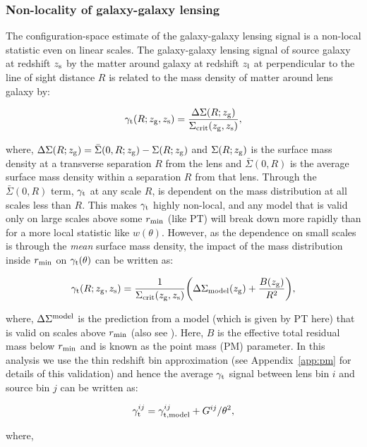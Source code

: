 \documentclass[aps, prd,twocolumn,superscriptaddress,nofootinbib,preprintnumbers]{revtex4-1}
\newcommand{\gammat}{\ensuremath{\gamma_{\rm t}(\theta)}}
\newcommand{\wtheta}{\ensuremath{w(\theta)}}
\begin{document}
\subsubsection{Non-locality of galaxy-galaxy lensing}  \label{sec:pm_theory}
The configuration-space estimate of the galaxy-galaxy lensing signal is a
non-local statistic even on linear scales. The galaxy-galaxy lensing
signal of source galaxy at redshift $z_{\rm s}$ by the matter around
galaxy at redshift $z_{\rm l}$ at perpendicular to the line of sight
distance $R$ is related to the mass density of matter around lens
galaxy by:
\begin{linenomath*}
\begin{equation}
    \gamma_{\rm t}(R;z_{\rm g},z_{\rm s}) = \frac{\Delta \Sigma (R;z_{\rm g})}{\Sigma_{\rm crit} (z_{\rm g},z_{\rm s})},
\end{equation}
\end{linenomath*}
where, $\Delta \Sigma(R;z_{\rm g}) = \bar{\Sigma}(0,R; z_{\rm g}) - \Sigma(R;z_{\rm g})$ and $\Sigma(R;z_{\rm g})$ is the surface mass density at a transverse separation $R$ from the lens and $\bar{\Sigma}(0,R)$ is the average surface mass density within a separation $R$ from that lens. Through the $\bar{\Sigma}(0,R)$ term, $\gamma_{\rm t}$  at any scale $R$, is dependent on the mass distribution at all scales less than $R$. This makes $\gamma_{\rm t}$  highly non-local, and any model that is valid only on large scales above some $r_{\rm min}$ (like PT) will break down more rapidly than for a more local statistic like \wtheta. However, as the dependence on small scales is through the \textit{mean} surface mass density, the impact of the mass distribution inside $r_{\rm min}$ on $\gammat$ can be written as:
\begin{linenomath*}
\begin{equation}
    \gamma_{\rm t}(R;z_{\rm g},z_{\rm s}) = \frac{1}{\Sigma_{\rm crit}(z_{\rm g},z_{\rm s})} \bigg(\Delta \Sigma_{\rm model}(z_{\rm g}) + \frac{B(z_{\rm g})}{R^2} \bigg),
\end{equation}
\end{linenomath*}
where, $\Delta \Sigma^{\rm model}$ is the prediction from a model (which is given by PT here) that is valid on scales above $r_{\rm min}$ (also see \citep{Baldauf_2010}). Here, $B$ is the effective total residual mass below $r_{\rm min}$ and is known as the point mass (PM) parameter. In this analysis we use the thin redshift bin approximation (see Appendix~\ref{app:pm} for details of this validation) and hence the average $\gamma_{\rm t}$ signal between lens bin $i$ and source bin $j$ can be written as:
\begin{linenomath*}
\begin{equation}
    \gamma^{ij}_{{\rm t}} = \gamma^{ij}_{{\rm t, model}} + G^{ij}/\theta^2,
\end{equation}
\end{linenomath*}
where,
\end{document}
